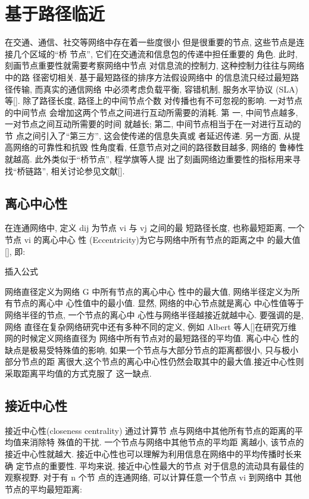 			
			
\section{基于路径临近}
在交通、通信、社交等网络中存在着一些度很小 但是很重要的节点, 这些节点是连接几个区域的“桥 节点”, 它们在交通流和信息包的传递中担任重要的 角色. 此时, 刻画节点重要性就需要考察网络中节点 对信息流的控制力, 这种控制力往往与网络中的路 径密切相关. 基于最短路径的排序方法假设网络中 的信息流只经过最短路径传输, 而真实的通信网络 中必须考虑负载平衡, 容错机制, 服务水平协议 (SLA)等[]. 除了路径长度, 路径上的中间节点个数 对传播也有不可忽视的影响. 一对节点的中间节点 会增加这两个节点之间进行互动所需要的消耗. 第 一, 中间节点越多, 一对节点之间互动所需要的时间 就越长; 第二, 中间节点相当于在一对进行互动的节 点之间引入了“第三方”, 这会使传递的信息失真或 者延迟传递. 另一方面, 从提高网络的可靠性和抗毁 性角度看, 任意节点对之间的路径数目越多, 网络的 鲁棒性就越高. 此外类似于“桥节点”, 程学旗等人提 出了刻画网络边重要性的指标用来寻找“桥链路”, 相关讨论参见文献[].

\subsection{离心中心性}
在连通网络中, 定义 dij 为节点 vi 与 vj 之间的最 短路径长度, 也称最短距离, 一个节点 vi 的离心中心 性 (Eccentricity)为它与网络中所有节点的距离之中 的最大值[], 即:

			插入公式

			网络直径定义为网络 G 中所有节点的离心中心 性中的最大值, 网络半径定义为所有节点的离心中 心性值中的最小值. 显然, 网络的中心节点就是离心 中心性值等于网络半径的节点, 一个节点的离心中 心性与网络半径越接近就越中心. 要强调的是, 网络 直径在复杂网络研究中还有多种不同的定义, 例如 Albert 等人[]在研究万维网的时候定义网络直径为 网络中所有节点对的最短路径的平均值. 离心中心 性的缺点是极易受特殊值的影响, 如果一个节点与大部分节点的距离都很小, 只与极小部分节点的距 离很大,这个节点的离心中心性仍然会取其中的最大值.接近中心性则采取距离平均值的方式克服了 这一缺点.
\subsection{接近中心性}
接近中心性(closeness centrality) 通过计算节
点与网络中其他所有节点的距离的平均值来消除特 殊值的干扰. 一个节点与网络中其他节点的平均距 离越小, 该节点的接近中心性就越大. 接近中心性也可以理解为利用信息在网络中的平均传播时长来确
定节点的重要性. 平均来说, 接近中心性最大的节点 对于信息的流动具有最佳的观察视野. 对于有 n 个节 点的连通网络, 可以计算任意一个节点 vi 到网络中 其他节点的平均最短距离:

